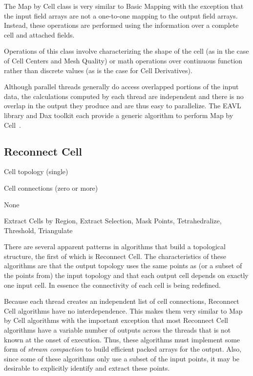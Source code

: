 \documentclass{sig-alternate}
\newcommand*{\lcite}[1]{~\cite{#1}}
\newcommand*{\keyterm}[1]{\emph{#1}}
\newcommand{\algclass}[1]{\textsf{#1}}
\newcommand{\alg}[1]{#1}
\newcommand{\algorithmclasssection}[1]{\subsection*{#1}}
\newcommand{\algorithmclass}[5]{
  \algorithmclasssection{#1} %
  \begin{description}[leftmargin=9em,style=nextline,noitemsep]
    \raggedright
  \item[Input] #2
  \item[Output] #3
  \item[Interdependence] #4
  \item[Algorithms] #5
  \end{description}
}
\begin{document}
\noindent
The \algclass{Map by Cell} class is very similar to \algclass{Basic
  Mapping} with the exception that the input field arrays are not a
one-to-one mapping to the output field arrays. Instead, these operations
are performed using the information over a complete cell and attached
fields.

Operations of this class involve characterizing the shape of the cell (as
in the case of \alg{Cell Centers} and \alg{Mesh Quality}) or math
operations over continuous function rather than discrete values (as is the
case for \alg{Cell Derivatives}).

Although parallel threads generally do access overlapped portions of the
input data, the calculations computed by each thread are independent and
there is no overlap in the output they produce and are thus easy to
parallelize. The EAVL library and Dax toolkit each provide a generic
algorithm to perform \algclass{Map by Cell}\lcite{EAVL,Moreland2011:LDAV}.


\algorithmclass{Reconnect Cell}
               {Cell topology (single)} %
               {Cell connections (zero or more)} %
               {None} %
               {
                 Extract Cells by Region,
                 Extract Selection,
                 Mask Points,
                 Tetrahedralize,
                 Threshold,
                 Triangulate
               }

\noindent
There are several apparent patterns in algorithms that build a topological
structure, the first of which is \algclass{Reconnect Cell}. The
characteristics of these algorithms are that the output topology uses the
same points as (or a subset of the points from) the input topology and that
each output cell depends on exactly one input cell. In essence the
connectivity of each cell is being redefined.

Because each thread creates an independent list of cell connections,
\algclass{Reconnect Cell} algorithms have no interdependence. This makes
them very similar to \algclass{Map by Cell} algorithms with the important
exception that most \algclass{Reconnect Cell} algorithms have a variable
number of outputs across the threads that is not known at the onset of
execution. Thus, these algorithms must implement some form of
\keyterm{stream compaction} to build efficient packed arrays for the
output. Also, since some of these algorithms only use a subset of the input
points, it may be desirable to explicitly identify and extract these
points.
\end{document}
